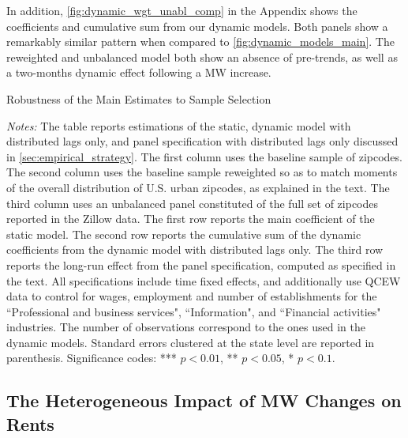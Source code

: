In addition, \autoref{fig:dynamic_wgt_unabl_comp} in the Appendix shows the coefficients and 
cumulative sum from our dynamic models. Both panels show a remarkably similar pattern when compared 
to \autoref{fig:dynamic_models_main}. The reweighted and unbalanced model both show an absence of 
pre-trends, as well as a two-months dynamic effect following a MW increase.


\begin{table}[h!]\centering
	\caption{Robustness of the Main Estimates to Sample Selection}  %
	\label{tab:wgt_unbal_comparison}
	
	\begin{minipage}{0.95\textwidth}\footnotesize
	\vspace{3mm}	
	\textit{Notes:} The table reports estimations of the static, dynamic model with distributed
	lags only, and panel specification with distributed lags only discussed in 
	\autoref{sec:empirical_strategy}. The first column uses the baseline sample of zipcodes. The 
	second column uses the baseline sample reweighted so as to match moments of the overall 
	distribution of U.S. urban zipcodes, as explained in the text. The third column uses an 
	unbalanced 	panel constituted of the full set of zipcodes reported in the Zillow data. The 
	first row reports the main coefficient of the static model. The second row reports the 
	cumulative sum of the dynamic coefficients from the dynamic model with distributed lags only. 
	The third row reports the long-run effect from the panel specification, computed as specified 
	in the text. All specifications include time fixed effects, and additionally use QCEW data to 
	control for wages, employment and number of establishments for the ``Professional and business 
	services", ``Information", and ``Financial activities" industries. The number of observations 
	correspond to the ones used in the dynamic models. 
	Standard errors clustered at the state level are reported in parenthesis. Significance codes: 
	*** $p < 0.01$, ** $p < 0.05$, * $p < 0.1$.
	\end{minipage}
\end{table}



\subsection{The Heterogeneous Impact of MW Changes on Rents}\label{sec:heter}


